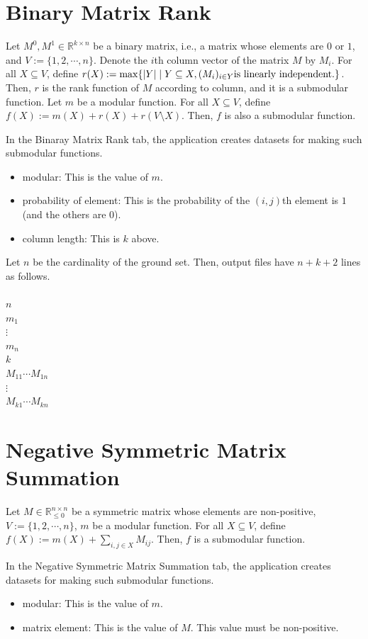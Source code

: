 \documentclass{article}
\newcommand{\re}{\mathbb{R}}
\newcommand{\modular}{modular: This is the value of $m$.
}
\newcommand{\exTab}[1]{
In the #1 tab,
the application creates datasets for making such submodular functions.}
\newcommand{\out}[1]{
Let $n$ be the cardinality of the ground set.
Then, output files have $#1$ lines as follows.\\ \mbox{}\\
}
\begin{document}
\newpage

\section{Binary Matrix Rank}\label{binaryMatirxRankSec}
Let $M^0,M^1 \in \re^{k\times n}$ be a binary matrix,
i.e., a matrix whose elements are $0$ or $1$,
and $V:=\{1,2,\cdots ,n\}$.
Denote the $i$th column vector of the matrix $M$ by $M_i$.
For all $X\subseteq V$,
define $r(X):= \max \{ |Y| \mid Y\subseteq X, (M_i)_{i\in Y} {\rm is~linearly~independent.} \}$.
Then, $r$ is the rank function of $M$ according to column,
and it is a submodular function.
Let $m$ be a modular function.
For all $X\subseteq V$,
define $f(X):=m(X)+r(X)+r(V\setminus X)$.
Then, $f$ is also a submodular function.
\exTab{Binaray Matrix Rank}

\begin{itemize}
\item \modular
\item probability of element: This is the probability of the $(i,j)$th element is $1$
(and the others are $0$).
\item column length: This is $k$ above.

\end{itemize}

\out{n+k+2}
$n$\\
$m_1$ \\
$\vdots$ \\
$m_n$ \\
$k$ \\
$M_{11}\cdots M_{1n}$\\
\mbox{\quad \quad}$\vdots$ \\
$M_{k1} \cdots M_{kn}$ \\


\newpage

\section{Negative Symmetric Matrix Summation}\label{NegativeSymmetricMatrixSummationSec}
Let $M\in \re_{\leq 0 }^{n\times n}$ be a symmetric matrix whose elements are non-positive,
$V:=\{1,2,\cdots,n\}$,
$m$ be a modular function.
For all $X\subseteq V$,
define $f(X):=m(X)+\sum_{i,j\in X}M_{ij}$.
Then, $f$ is a submodular function.
\exTab{Negative Symmetric Matrix Summation}

\begin{itemize}
\item \modular
\item matrix element: This is the value of $M$.
This value must be non-positive.
\end{itemize}
\end{document}
